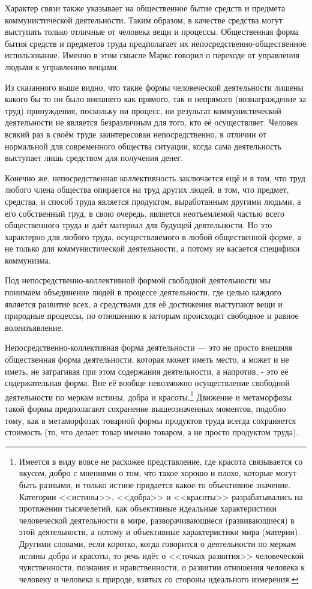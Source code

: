 \documentclass[../main]{subfiles}
\begin{document}
Характер связи также указывает на общественное бытие средств и предмета коммунистической деятельности. Таким образом, в качестве средства могут выступать только отличные от человека вещи и процессы. Общественная форма бытия средств и предметов труда предполагает их непосредственно-общественное использование. Именно в этом смысле Маркс говорил о переходе от управления людьми к управлению вещами.

Из сказанного выше видно, что такие формы человеческой деятельности лишены какого бы то ни было внешнего как прямого, так и непрямого (вознаграждение за труд) принуждения, поскольку ни процесс, ни результат коммунистической деятельности не является безразличным для того, кто её осуществляет. Человек всякий раз в своём труде заинтересован непосредственно, в отличии от нормальной для современного общества ситуации, когда сама деятельность выступает лишь средством для получения денег.

Конечно же, непосредственная коллективность заключается ещё и в том, что труд любого члена общества опирается на труд других людей, в том, что предмет, средства, и способ труда является продуктом, выработанным другими людьми, а его собственный труд, в свою очередь, является неотъемлемой частью всего общественного труда и даёт материал для будущей деятельности. Но это характерно для любого труда, осуществляемого в любой общественной форме, а не только для коммунистической деятельности, а потому не касается специфики коммунизма.

Под непосредственно-коллективной формой свободной деятельности мы понимаем объединение людей в процессе деятельности, где целью каждого является развитие всех, а средствами для её достижения выступают вещи и природные процессы, по отношению к которым происходит свободное и равное волеизъявление.

Непосредственно-коллективная форма деятельности — это не просто внешняя общественная форма деятельности, которая может иметь место, а может и не иметь, не затрагивая при этом содержания деятельности, а напротив, - это её содержательная форма. Вне её вообще невозможно осуществление свободной деятельности по меркам истины, добра и красоты.\footnote{Имеется в виду вовсе не расхожее представление, где красота связывается со вкусом, добро с мнениями о том, что такое хорошо и плохо, которые могут быть разными, и только истине придается какое-то объективное значение. Категории <<истины>>, <<добра>> и <<красоты>> разрабатывались на протяжении тысячелетий, как объективные идеальные характеристики человеческой деятельности в мире, разворачивающиеся (развивающиеся) в этой деятельности, а потому и объективные характеристики мира (материи). Другими словами, если коротко, когда говорится о деятельности по меркам истины добра и красоты, то речь идёт о <<точках развития>> человеческой чувственности, познания и нравственности, о развитии отношения человека к человеку и человека к природе, взятых со стороны идеального измерения.} Движение и метаморфозы такой формы предполагают сохранение вышеозначенных моментов, подобно тому, как в метаморфозах товарной формы продуктов труда всегда сохраняется стоимость (то, что делает товар именно товаром, а не просто продуктом труда).
\end{document}

